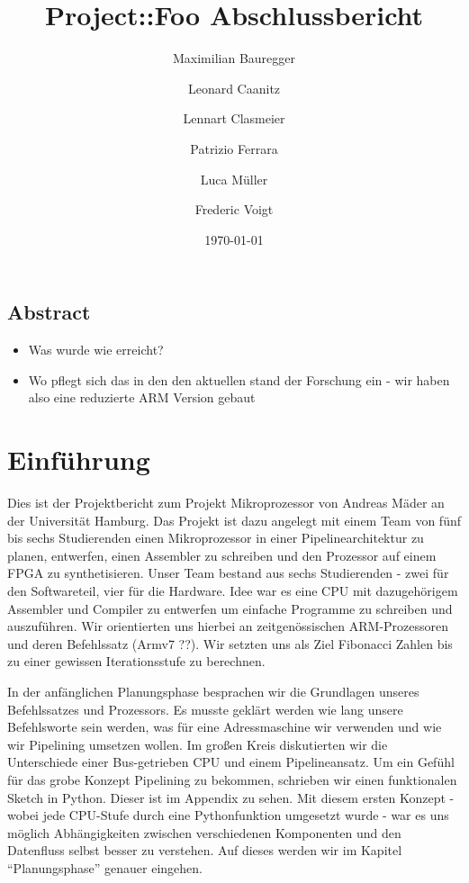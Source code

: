 \documentclass[paper=a4,fontsize=12pt,twocolumn]{scrreprt}
\title{Project::Foo Abschlussbericht}
\author{Maximilian Bauregger \and Leonard Caanitz \and Lennart Clasmeier \and Patrizio Ferrara \and Luca Müller \and Frederic Voigt}
\date{\today}
\begin{document}
\maketitle

\tableofcontents

\section*{Abstract}

\begin{itemize}
    \item Was wurde wie erreicht?
    \item Wo pflegt sich das in den den aktuellen stand der Forschung ein - wir haben also eine reduzierte ARM Version gebaut
\end{itemize}
\kant[1]


\chapter{Einführung}
Dies ist der Projektbericht zum Projekt Mikroprozessor von Andreas Mäder an der Universität Hamburg.
Das Projekt ist dazu angelegt mit einem Team von fünf bis sechs Studierenden einen Mikroprozessor in einer Pipelinearchitektur zu planen, entwerfen, einen Assembler zu schreiben und den Prozessor  auf einem FPGA zu synthetisieren.
Unser Team bestand aus sechs Studierenden - zwei für den Softwareteil, vier für die Hardware.
Idee war es eine CPU mit dazugehörigem Assembler und Compiler zu entwerfen um einfache Programme zu schreiben und auszuführen.
Wir orientierten uns hierbei an zeitgenössischen ARM-Prozessoren und deren Befehlssatz (Armv7 ??).
Wir setzten uns als Ziel Fibonacci Zahlen bis zu einer gewissen Iterationsstufe zu berechnen.

In der anfänglichen Planungsphase besprachen wir die Grundlagen unseres Befehlssatzes und Prozessors.
Es musste geklärt werden wie lang unsere Befehlsworte sein werden, was für eine Adressmaschine wir verwenden und wie wir Pipelining umsetzen wollen.
Im großen Kreis diskutierten wir die Unterschiede einer Bus-getrieben CPU und einem Pipelineansatz.
Um ein Gefühl für das grobe Konzept Pipelining zu bekommen, schrieben wir einen funktionalen Sketch in Python.
Dieser ist im Appendix zu sehen.
Mit diesem ersten Konzept - wobei jede CPU-Stufe durch eine Pythonfunktion umgesetzt wurde - war es uns möglich Abhängigkeiten zwischen verschiedenen Komponenten und den Datenfluss selbst besser zu verstehen.
Auf dieses werden wir im Kapitel \enquote{Planungsphase} genauer eingehen.
\end{document}

